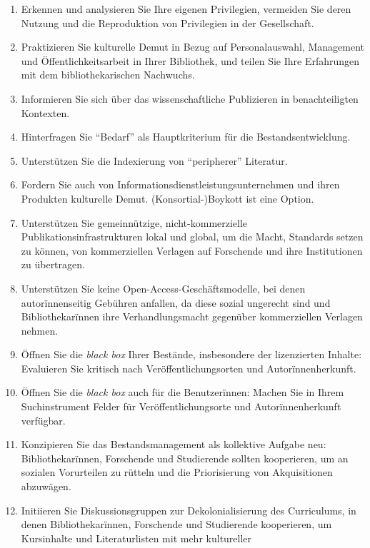 \documentclass[a4paper,
fontsize=11pt,
oneside,
numbers=noperiodatend,
parskip=half-,
bibliography=totoc,
final
]{scrartcl}
\begin{document}
\begin{enumerate}
\def\labelenumi{\arabic{enumi}.}
\item
  Erkennen und analysieren Sie Ihre eigenen Privilegien, vermeiden Sie
  deren Nutzung und die Reproduktion von Privilegien in der
  Gesellschaft.
\item
  Praktizieren Sie kulturelle Demut in Bezug auf Personalauswahl,
  Management und Öffentlichkeitsarbeit in Ihrer Bibliothek, und teilen
  Sie Ihre Erfahrungen mit dem bibliothekarischen Nachwuchs.
\item
  Informieren Sie sich über das wissenschaftliche Publizieren in
  benachteiligten Kontexten.
\item
  Hinterfragen Sie \enquote{Bedarf} als Hauptkriterium für die
  Bestandsentwicklung.
\item
  Unterstützen Sie die Indexierung von \enquote{peripherer} Literatur.
\item
  Fordern Sie auch von Informationsdienstleistungsunternehmen und ihren
  Produkten kulturelle Demut. (Konsortial-)Boykott ist eine Option.
\item
  Unterstützen Sie gemeinnützige, nicht-kommerzielle
  Publikationsinfrastrukturen lokal \linebreak und global, um die Macht, Standards
  setzen zu können, von kommerziellen Verlagen auf Forschende und ihre
  Institutionen zu übertragen.
\item
  Unterstützen Sie keine Open-Access-Geschäftsmodelle, bei denen
  autorïnnenseitig Gebühren anfallen, da diese sozial ungerecht sind und
  Bibliothekarïnnen ihre Verhandlungsmacht gegenüber kommerziellen
  Verlagen nehmen.
\item
  Öffnen Sie die \emph{black box} Ihrer Bestände, insbesondere der
  lizenzierten Inhalte: Evaluieren Sie kritisch nach
  Veröffentlichungsorten und Autorïnnenherkunft.
\item
  Öffnen Sie die \emph{black box} auch für die Benutzerïnnen: Machen Sie
  in Ihrem Suchinstrument Felder für Veröffentlichungsorte und
  Autorïnnenherkunft verfügbar.
\item
  Konzipieren Sie das Bestandsmanagement als kollektive Aufgabe neu:
  Bibliothekarïnnen, Forschende und Studierende sollten kooperieren, um
  an sozialen Vorurteilen zu rütteln und die Priorisierung von
  Akquisitionen abzuwägen.
\item
  Initiieren Sie Diskussionsgruppen zur Dekolonialisierung des
  Curriculums, in denen Bibliothekarïnnen, Forschende und Studierende
  kooperieren, um Kursinhalte und Literaturlisten mit mehr kultureller

\end{enumerate}
\end{document}
